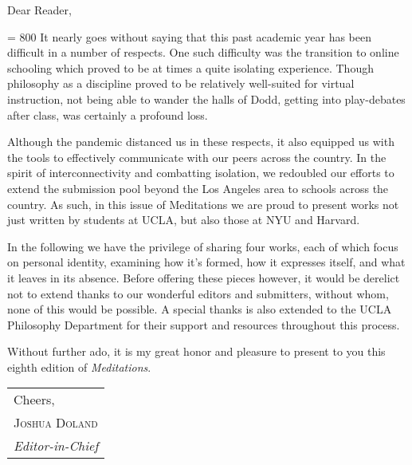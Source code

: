 \noindent Dear Reader,
\bigbreak

\pretolerance = 800
It nearly goes without saying that this past academic year has been difficult in a number of respects. One such difficulty was the transition to online schooling which proved to be at times a quite isolating experience. Though philosophy as a discipline proved to be relatively well-suited for virtual instruction, not being able to wander the halls of Dodd, getting into play-debates after class, was certainly a profound loss. 

Although the pandemic distanced us in these respects, it also equipped us with the tools to effectively communicate with our peers across the country. In the spirit of interconnectivity and combatting isolation, we redoubled our efforts to extend the submission pool beyond the Los Angeles area to schools across the country. As such, in this issue of Meditations we are proud to present works not just written by students at UCLA, but also those at NYU and Harvard. 

In the following we have the privilege of sharing four works, each of which focus on personal identity, examining how it’s formed, how it expresses itself, and what it leaves in its absence. Before offering these pieces however, it would be derelict not to extend thanks to our wonderful editors and submitters, without whom, none of this would be possible. A special thanks is also extended to the UCLA Philosophy Department for their support and resources throughout this process.

Without further ado, it is my great honor and pleasure to present to you this eighth edition of \textit{Meditations}. 


\bigbreak
\hfill
\begin{tabular}{@{}l@{}}
	Cheers,	\\
	\scshape Joshua Doland \\
	\textit{Editor-in-Chief}
\end{tabular}